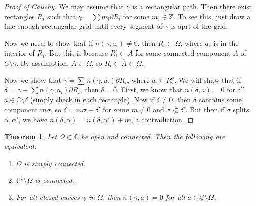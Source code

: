 \documentclass[leqno, openany]{memoir}
\newtheorem{thm}{Theorem}[section]
\theoremstyle{definition}
\theoremstyle{remark}
\theoremstyle{plain}
\theoremstyle{definition}
\theoremstyle{remark}
\newcommand{\C}{\mathbb{C}}
\newcommand{\Z}{\mathbb{Z}}
\renewcommand{\P}{\mathbb{P}}
\newcommand{\ol}[1]{\overline{#1}}
\begin{document}
\begin{proof}[Proof of Cauchy]
    We may assume that $\gamma$ is a rectangular path. Then there exist rectangles $R_i$ such that $\gamma = \sum m_i \partial R_i$ for some $m_i \in \Z$. To see this, just draw a fine enough rectangular grid until every segment of $\gamma$ is aprt of the grid.

    Now we need to show that if $n(\gamma, a_i) \neq 0$, then $R_i \subset \Omega$, where $a_i$ is in the interior of $R_i$. But this is because $R_i^{\circ} \subset A$ for some connected component $A$ of $C \setminus \gamma$. By assumption, $A \subset \Omega$, so $R_i \subset \ol{A} \subset \Omega$.

    Now we show that $\gamma = \sum n(\gamma, a_i) \partial R_i$, where $a_i \in R_i^{\circ}$. We will show that if $\delta \coloneqq \gamma - \sum n(\gamma, a_i) \partial R_i$, then $\delta = 0$. First, we know that $n(\delta, a) = 0$ for all $a \in \C \setminus \delta$ (simply check in each rectangle). Now if $\delta \neq 0$, then $\delta$ contains some component $m \sigma$, so $\delta = m \sigma + \delta'$ for some $m \neq 0$ and $\sigma \not\subset \delta'$. But then if $\sigma$ splits $\alpha, \alpha'$, we have $n(\delta, \alpha) = n(\delta, \alpha') + m$, a contradiction.
\end{proof}

\begin{thm}
    Let $\Omega \subset \C$ be open and connected. Then the following are equivalent:
    \begin{enumerate}
        \item $\Omega$ is simply connected.
        \item $\P^1 \setminus \Omega$ is connected.
        \item For all closed curves $\gamma$ in $\Omega$, then $n(\gamma, a) = 0$ for all $a \in \C \setminus \Omega$.
    \end{enumerate}
\end{thm}
\end{document}
